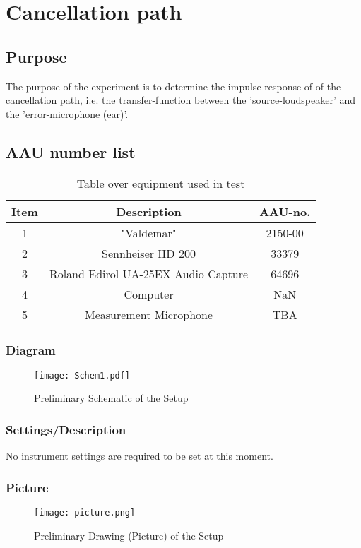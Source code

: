 \section{Cancellation path}
\subsection{Purpose}
The purpose of the experiment is to determine the impulse response of of the cancellation path, i.e. the transfer-function between the 'source-loudspeaker' and the 'error-microphone (ear)'.
		
\subsection{AAU number list}
\begin{table}[h]
	\centering
	\begin{tabular}{ c c c } \toprule
		{Item} & {Description} & {AAU-no}. \\ \bottomrule 
		1      &  "Valdemar"							& 2150-00	\\
		2      &  Sennheiser HD 200						& 33379		\\
		3      &  Roland Edirol UA-25EX Audio Capture	& 64696		\\
		4      &  Computer								& NaN		\\  
		5      &  Measurement Microphone				& TBA		\\ \bottomrule 
	\end{tabular}
	\caption{Table over equipment used in test}
	\label{tab:UsedEquipmentListning1}
\end{table}

\subsubsection{Diagram}
\begin{figure}[H]
	\centering
	\texttt{[image: Schem1.pdf]}
	\caption{Preliminary Schematic of the Setup}
	\label{Schematic}
\end{figure}

\subsubsection{Settings/Description}
No instrument settings are required to be set at this moment.

\subsubsection{Picture}
\begin{figure}[H]
	\centering
	\texttt{[image: picture.png]}
	\caption{Preliminary Drawing (Picture) of the Setup}
	\label{PictureDrawing}
\end{figure}

